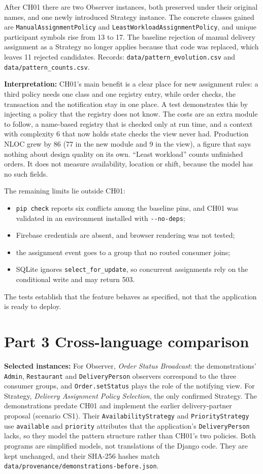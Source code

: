 \documentclass[11pt,a4paper]{article}
\newcommand{\entry}[1]{\par\textbf{#1:} }
\newcommand{\code}[1]{\nolinkurl{#1}}
\begin{document}
After CH01 there are two Observer instances, both preserved under their original names, and one newly introduced Strategy instance. The concrete classes gained are \code{ManualAssignmentPolicy} and \code{LeastWorkloadAssignmentPolicy}, and unique participant symbols rise from 13 to 17. The baseline rejection of manual delivery assignment as a Strategy no longer applies because that code was replaced, which leaves 11 rejected candidates. Records: \code{data/pattern_evolution.csv} and \code{data/pattern_counts.csv}.

\entry{Interpretation}CH01's main benefit is a clear place for new assignment rules: a third policy needs one class and one registry entry, while order checks, the transaction and the notification stay in one place. A test demonstrates this by injecting a policy that the registry does not know. The costs are an extra module to follow, a name-based registry that is checked only at run time, and a context with complexity 6 that now holds state checks the view never had. Production NLOC grew by 86 (77 in the new module and 9 in the view), a figure that says nothing about design quality on its own. ``Least workload'' counts unfinished orders. It does not measure availability, location or shift, because the model has no such fields.

The remaining limits lie outside CH01:
\begin{itemize}
\item \code{pip check} reports six conflicts among the baseline pins, and CH01 was validated in an environment installed with \code{--no-deps};
\item Firebase credentials are absent, and browser rendering was not tested;
\item the assignment event goes to a group that no routed consumer joins;
\item SQLite ignores \code{select_for_update}, so concurrent assignments rely on the conditional write and may return 503.
\end{itemize}
The tests establish that the feature behaves as specified, not that the application is ready to deploy.

\section{Part 3 Cross-language comparison}
\entry{Selected instances}For Observer, \emph{Order Status Broadcast}: the demonstrations' \code{Admin}, \code{Restaurant} and \code{DeliveryPerson} observers correspond to the three consumer groups, and \code{Order.setStatus} plays the role of the notifying view. For Strategy, \emph{Delivery Assignment Policy Selection}, the only confirmed Strategy. The demonstrations predate CH01 and implement the earlier delivery-partner proposal (scenario CS1). Their \code{AvailabilityStrategy} and \code{PriorityStrategy} use \code{available} and \code{priority} attributes that the application's \code{DeliveryPerson} lacks, so they model the pattern structure rather than CH01's two policies. Both programs are simplified models, not translations of the Django code. They are kept unchanged, and their SHA-256 hashes match \code{data/provenance/demonstrations-before.json}.
\end{document}

